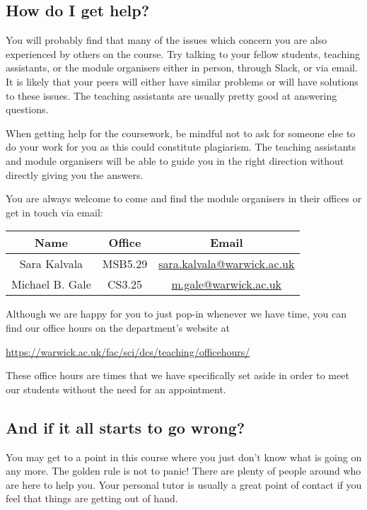 \subsection{How do I get help?}
\label{sec:how-to-get-help}

You will probably find that many of the issues which concern you are also experienced by others on the course. Try talking to your fellow students, teaching assistants, or the module organisers either in person, through Slack, or via email. It is likely that your peers will either have similar problems or will have solutions to these issues. The teaching assistants are usually pretty good at answering questions. 

When getting help for the coursework, be mindful not to ask for someone else to do your work for you as this could constitute plagiarism. The teaching assistants and module organisers will be able to guide you in the right direction without directly giving you the answers.

You are always welcome to come and find the module organisers in their offices or get in touch via email:
\begin{center}
	\begin{tabular}{|c|c|c|}
		\hline 
		\textbf{Name} & \textbf{Office} & \textbf{Email} \\ 
		\hline 
		Sara Kalvala & MSB5.29 & \href{mailto:sara.kalvala@warwick.ac.uk}{sara.kalvala@warwick.ac.uk} \\ 
		\hline 
		Michael B. Gale & CS3.25 & \href{mailto:m.gale@warwick.ac.uk}{m.gale@warwick.ac.uk} \\ 
		\hline 
	\end{tabular} 
\end{center}
Although we are happy for you to just pop-in whenever we have time, you can find our office hours on the department's website at 
\begin{center}
	\url{https://warwick.ac.uk/fac/sci/dcs/teaching/officehours/}
\end{center}
These office hours are times that we have specifically set aside in order to meet our students without the need for an appointment.

\subsection{And if it all starts to go wrong?}

You may get to a point in this course where you just don't know what is going on any more. The golden rule is not to panic! There are plenty of people around who are here to help you. Your personal tutor is usually a great point of contact if you feel that things are getting out of hand.   

